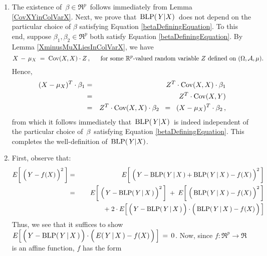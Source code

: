\begin{enumerate}
\item
	The existence of \,$\beta \in \Re^{p}$\, follows immediately from Lemma \ref{CovXYinColVarX}.
	Next, we prove that \,$\textnormal{BLP}(\,Y\vert X)$\, does not depend on the particular choice of $\beta$
	satisfying Equation \eqref{betaDefiningEquation}.
	To this end, suppose $\beta_{1}, \beta_{2} \in \Re^{p}$ both satisfy
	Equation \eqref{betaDefiningEquation}.
	By Lemma \ref{XminusMuXLiesInColVarX}, we have
	\begin{equation*}
	X \,-\, \mu_{X} \; = \; \textnormal{Cov}(X,X) \cdot Z\,,
	\quad\;\;
	\textnormal{for some $\mathbb{R}^{p}$-valued random variable $Z$ defined on $(\Omega,\mathcal{A},\mu)$}.
	\end{equation*}
	Hence,
	\begin{eqnarray*}
	(X-\mu_{X})^{T} \cdot \beta_{1}
	&=& Z^{T} \cdot \textnormal{Cov}(X,X) \cdot \beta_{1}
	\\
	&=& Z^{T} \cdot \textnormal{Cov}(X,Y)
	\\
	&=& Z^{T} \cdot \textnormal{Cov}(X,X) \cdot \beta_{2}
		\;\; = \;\; (X-\mu_{X})^{T} \cdot \beta_{2}\,,
	\end{eqnarray*}
	from which it follows immediately that \,$\textnormal{BLP}(\,Y\vert X)$\, is indeed independent of the particular choice of
	\,$\beta$\, satisfying Equation \eqref{betaDefiningEquation}.
	This completes the well-definition of \,$\textnormal{BLP}(\,Y\vert X)$.
\item
	First, observe that:
	\begin{eqnarray*}
	E\!\left[\;\left(\,Y \overset{{\color{white}.}}{-} f(X)\,\right)^{2}\,\right]
	&=&
		E\!\left[\;\left(\,Y \overset{{\color{white}.}}{-} \blp(\,Y\,\vert\,X\,) + \blp(\,Y\,\vert\,X\,) - f(X)\,\right)^{2}\,\right]
	\\
	&=&
		{\color{white}+}\;\;
		E\!\left[\;\left(\,Y \overset{{\color{white}.}}{-} \blp(\,Y\,\vert\,X\,)\,\right)^{2}\,\right]
		\;+\;
		E\!\left[\;\left(\,\blp(\,Y\,\vert\,X\,) \overset{{\color{white}.}}{-} f(X)\,\right)^{2}\,\right]
	\\
	&&
		+\;
		2 \cdot E\!\left[\,
			\left(\,Y \overset{{\color{white}.}}{-} \blp(\,Y\,\vert\,X\,)\,\right)
			\cdot
			\left(\,\blp(\,Y\,\vert\,X\,) \overset{{\color{white}.}}{-} f(X)\,\right)
			\,\right]
	\end{eqnarray*}
	Thus, we see that it suffices to show
	$E\!\left[\,
		\left(\,Y \overset{{\color{white}.}}{-} \blp(\,Y\,\vert\,X\,)\,\right)
		\cdot
		\left(\,E(\,Y\,\vert\,X\,) \overset{{\color{white}.}}{-} f(X)\,\right)
		\,\right] \,=\, 0$.
	Now, since $f : \Re^{p}\longrightarrow\Re$ is an affine function, $f$ has the form

\end{enumerate}
